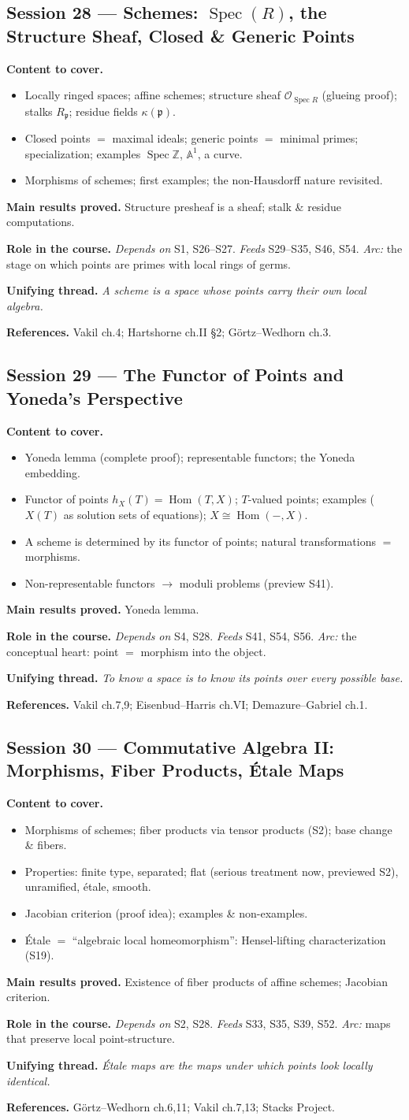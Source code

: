 \documentclass[11pt,a4paper]{article}
\newcommand{\sess}[2]{\subsection[#1. #2]{Session #1 --- #2}}
\newcommand{\chead}{\par\smallskip\noindent\textbf{Content to cover.}}
\newcommand{\proved}[1]{\par\smallskip\noindent\textbf{Main results proved.} #1}
\newcommand{\role}[1]{\par\smallskip\noindent\textbf{Role in the course.} #1}
\newcommand{\thread}[1]{\par\smallskip\noindent\textbf{Unifying thread.} \textit{#1}}
\newcommand{\srefs}[1]{\par\smallskip\noindent\textbf{References.} #1}
\newcommand{\Z}{\mathbb{Z}}
\newcommand{\Spec}{\operatorname{Spec}}
\newcommand{\Hom}{\operatorname{Hom}}
\newcommand{\p}{\mathfrak{p}}
\begin{document}
	\sess{28}{Schemes: $\Spec(R)$, the Structure Sheaf, Closed \& Generic Points}
	\chead
	\begin{itemize}
		\item Locally ringed spaces; affine schemes; structure sheaf $\mathcal O_{\Spec R}$ (glueing proof); stalks $R_\p$; residue fields $\kappa(\p)$.
		\item Closed points $=$ maximal ideals; generic points $=$ minimal primes; specialization; examples $\Spec\Z$, $\mathbb A^1$, a curve.
		\item Morphisms of schemes; first examples; the non-Hausdorff nature revisited.
	\end{itemize}
	\proved{Structure presheaf is a sheaf; stalk \& residue computations.}
	\role{\emph{Depends on} S1, S26--S27. \emph{Feeds} S29--S35, S46, S54. \emph{Arc:} the stage on which points are primes with local rings of germs.}
	\thread{A scheme is a space whose points carry their own local algebra.}
	\srefs{Vakil ch.4; Hartshorne ch.II \S2; G\"ortz--Wedhorn ch.3.}
	
	\sess{29}{The Functor of Points and Yoneda's Perspective}
	\chead
	\begin{itemize}
		\item Yoneda lemma (complete proof); representable functors; the Yoneda embedding.
		\item Functor of points $h_X(T)=\Hom(T,X)$; $T$-valued points; examples ($X(T)$ as solution sets of equations); $X\cong\Hom(-,X)$.
		\item A scheme is determined by its functor of points; natural transformations $=$ morphisms.
		\item Non-representable functors $\to$ moduli problems (preview S41).
	\end{itemize}
	\proved{Yoneda lemma.}
	\role{\emph{Depends on} S4, S28. \emph{Feeds} S41, S54, S56. \emph{Arc:} the conceptual heart: point $=$ morphism into the object.}
	\thread{To know a space is to know its points over every possible base.}
	\srefs{Vakil ch.7,9; Eisenbud--Harris ch.VI; Demazure--Gabriel ch.1.}
	
	\sess{30}{Commutative Algebra II: Morphisms, Fiber Products, \'Etale Maps}
	\chead
	\begin{itemize}
		\item Morphisms of schemes; fiber products via tensor products (S2); base change \& fibers.
		\item Properties: finite type, separated; flat (serious treatment now, previewed S2), unramified, \'etale, smooth.
		\item Jacobian criterion (proof idea); examples \& non-examples.
		\item \'Etale $=$ ``algebraic local homeomorphism'': Hensel-lifting characterization (S19).
	\end{itemize}
	\proved{Existence of fiber products of affine schemes; Jacobian criterion.}
	\role{\emph{Depends on} S2, S28. \emph{Feeds} S33, S35, S39, S52. \emph{Arc:} maps that preserve local point-structure.}
	\thread{\'Etale maps are the maps under which points look locally identical.}
	\srefs{G\"ortz--Wedhorn ch.6,11; Vakil ch.7,13; Stacks Project.}
	
\end{document}
